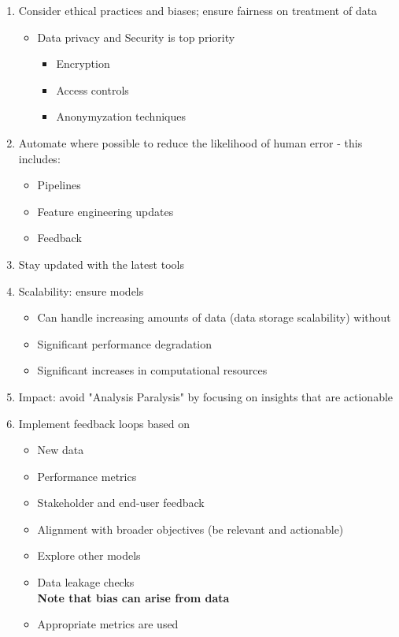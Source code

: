 \documentclass[11pt]{report}
\begin{document}
{\begin{multicols}{2}
\begin{enumerate}
\begin{itemize}
		\end{itemize}
		\item Consider ethical practices and biases; ensure fairness on treatment of data 
		\begin{itemize}
			\item Data privacy and Security is top priority
				\begin{itemize}
					\item Encryption
					\item Access controls 
					\item Anonymyzation techniques
				\end{itemize}
		\end{itemize}
		\item Automate where possible to reduce the likelihood of human error - this includes:
		\begin{itemize}
			\item Pipelines
			\item Feature engineering updates 
			\item Feedback 
		\end{itemize}
		\item Stay updated with the latest tools
		\item Scalability: ensure models  
		\begin{itemize}
			\item Can handle increasing amounts of data (data storage scalability) without 
			\item Significant performance degradation 
			\item Significant increases in computational resources
		\end{itemize} 
		\item Impact: avoid "Analysis Paralysis" by focusing on insights that are actionable 
		\item Implement feedback loops based on
		\begin{itemize}
			\item New data
			\item Performance metrics
			\item Stakeholder and end-user feedback
			\item Alignment with broader objectives (be relevant and actionable)
			\item Explore other models
			\item Data leakage checks \\
			\textbf{Note that bias can arise from data}
			\item Appropriate metrics are used 

\end{itemize}
\end{enumerate}
\end{multicols}}
\end{document}
